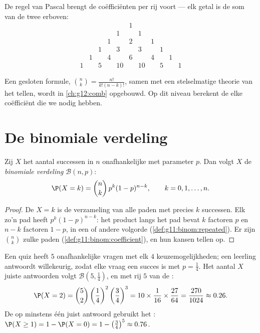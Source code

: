 De regel van Pascal brengt de coëfficiënten  per rij voort --- elk getal is
de som van de twee erboven:
\[
\begin{array}{ccccccccccc}
&&&&&1&&&&&\\
&&&&1&&1&&&&\\
&&&1&&2&&1&&&\\
&&1&&3&&3&&1&&\\
&1&&4&&6&&4&&1&\\
1&&5&&10&&10&&5&&1
\end{array}
\]

\begin{remark}
Een gesloten formule, $\binom nk = \frac{n!}{k!(n-k)!}$, samen met een
stelselmatige theorie van het tellen, wordt in \cref{ch:g12:comb} opgebouwd.
Op dit niveau berekent de  elke coëfficiënt die we nodig
hebben.
\end{remark}

\section{De binomiale verdeling}

\begin{theorem}\label{thm:g11:binom:binomial}
Zij $X$ het aantal successen in $n$ onafhankelijke  met
parameter $p$. Dan volgt $X$ de \emph{binomiale verdeling} $\mathcal B(n, p)$:
\[
\P(X = k) = \binom{n}{k}\, p^k (1-p)^{n-k},
\qquad k = 0, 1, \dots, n .
\]
\end{theorem}

\begin{proof}
De  $X = k$ is de verzameling van alle paden met precies $k$
successen. Elk zo'n pad heeft  $p^k(1-p)^{n-k}$: het product langs het pad
bevat $k$ factoren $p$ en $n - k$ factoren $1-p$, in een of andere volgorde
(\cref{def:g11:binom:repeated}). Er zijn $\binom nk$ zulke paden
(\cref{def:g11:binom:coefficient}), en hun kansen tellen op.
\end{proof}

\begin{example}\label{ex:g11:binom:quiz}
Een quiz heeft $5$ onafhankelijke vragen met elk $4$ keuzemogelijkheden; een
leerling antwoordt willekeurig, zodat elke vraag een succes is met
$p = \frac14$. Het aantal $X$ juiste antwoorden volgt
$\mathcal B\left(5, \frac14\right)$, en met rij $5$ van de :
\[
\P(X = 2) = \binom52 \left(\frac14\right)^2\left(\frac34\right)^3
= 10 \times \frac{1}{16} \times \frac{27}{64}
= \frac{270}{1024} \approx 0.26 .
\]
De  op minstens één juist antwoord gebruikt het :
$\P(X \geq 1) = 1 - \P(X = 0) = 1 - \left(\frac34\right)^5 \approx 0.76$.
\end{example}

